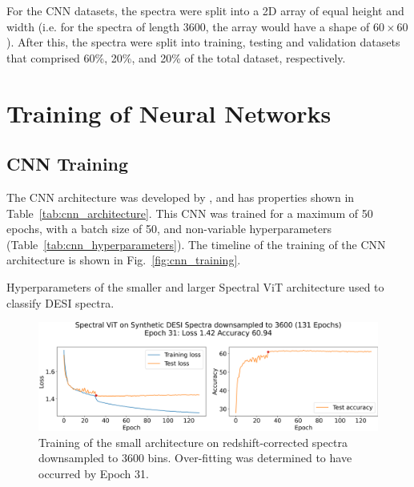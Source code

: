 For the CNN datasets, the spectra were split into a 2D array of equal height and width 
(i.e. for the spectra of length 3600, the array would have a shape of $60\times60$). 
After this, the spectra were split into training, testing and validation datasets that 
comprised 60\%, 20\%, and 20\% of the total dataset, respectively.


\section{Training of Neural Networks}
\label{sec:training} 
\subsection{CNN Training}
\label{ssec:cnn_training}
The CNN architecture was developed by \textcite{Sepeku2022}, and has properties 
shown in Table~\ref{tab:cnn_architecture}.
This CNN was trained for a maximum of 50 epochs, with a batch size of 50, and 
non-variable hyperparameters (Table~\ref{tab:cnn_hyperparameters}). 
The timeline of the training of the CNN architecture is shown in Fig.~\ref{fig:cnn_training}.



\begin{table}[t]
    \small
    \centering
    \sffamily
    
    \caption{Hyperparameters of the smaller and larger Spectral ViT architecture used to classify DESI spectra.}
    \label{tab:t_hyper}
\end{table}

\begin{figure}[b!]
    \centering
    \includegraphics[width=.8\linewidth]{figures/v1_real/vit_model_V1_original_redotraining_new.png}
    \caption[Training of Spectral ViT: V1]{Training of the small architecture on redshift-corrected spectra downsampled to 3600 bins. Over-fitting was determined to have occurred by Epoch 31.}
    \label{fig:vit1_training}
\end{figure}
